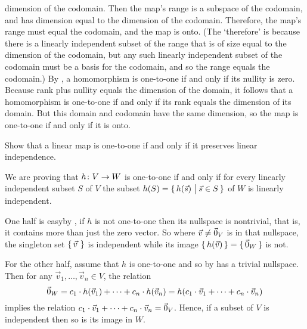 \begin{exercises}
\begin{answer}
\begin{exparts}
          dimension of the codomain.
          Then the map's range is a subspace of the codomain, and has
          dimension equal to the dimension of the codomain.
          Therefore, the map's range must equal the codomain, and the
          map is onto. 
          (The `therefore' is because
          there is a linearly independent subset of the range that is
          of size  equal to the dimension of the codomain,
          but any such linearly independent subset of the codomain must be a 
          basis for the codomain, and so the range equals the codomain.)
        \partsitem By , 
          a homomorphism is one-to-one if and only if its nullity is zero.
          Because rank plus nullity equals the dimension of the domain,
          it follows that a homomorphism is one-to-one if and only
          if its rank equals the dimension of its domain.
          But this domain and codomain have the same dimension,
          so the map is one-to-one if and only if it is onto.  
      \end{exparts}
   \end{answer}
  \item \label{exer:NonSingIffPreservLI} 
    Show that a linear map is one-to-one if and only if it preserves 
    linear independence.
    \begin{answer}
      We are proving that \( \mbox{$h\colon V\to W$} \) is one-to-one if and only
      if for every linearly independent subset \( S \) of \( V \) the subset
      \( h(S)=\mbox{$\{\,h(\vec{s})\bigm| \vec{s}\in S\,\}$} \) of \( W \) is linearly
      independent.

      One half is easy\Dash by , 
      if \( h \) is not one-to-one then its nullspace is
      nontrivial, that is, it contains more than just the zero vector.
      So 
      where \( \vec{v}\neq\vec{0}_V \) is in that nullspace, the singleton set
      \( \mbox{$\{\,\vec{v\,}\,\}$} \) is independent while its image
      \( \mbox{$\{\,h(\vec{v})\,\}$}=\mbox{$\{\,\vec{0}_W\,\}$} \) is not.

      For the other half,
      assume that \( h \) is one-to-one and so by
       has a trivial nullspace.
      Then for any \( \vec{v}_1,\dots,\vec{v}_n\in V \), the relation
      \begin{equation*}
        \vec{0}_W=
        c_1\cdot h(\vec{v}_1)+\dots+c_n\cdot h(\vec{v}_n)
        =h(c_1\cdot \vec{v}_1+\dots+c_n\cdot \vec{v}_n)
      \end{equation*}
      implies the relation 
      \( c_1\cdot \vec{v}_1+\dots+c_n\cdot \vec{v}_n=\vec{0}_V \).
      Hence, if a subset of \( V \) is independent then so is its image in
      \( W \).  


\end{answer}
\end{exercises}

